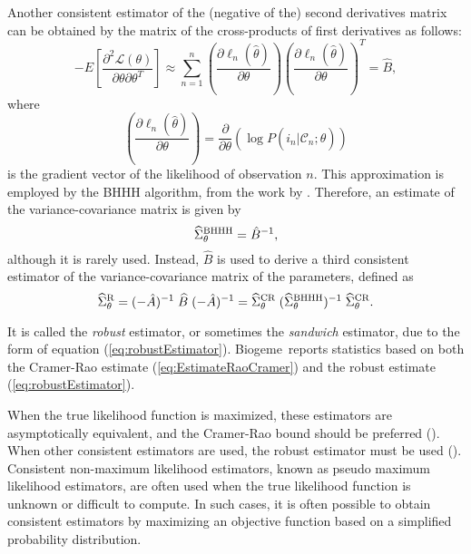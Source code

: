 \documentclass[12pt,a4paper]{article}
\newcommand{\req}[1]{(\ref{#1})}
\newcommand{\C}{\mathcal{C}}
\renewcommand{\L}{\mathcal{L}}
\newcommand{\BIOGEME}{Biogeme}
\begin{document}
Another consistent estimator of the (negative of the) second
derivatives matrix can be obtained by the matrix of the cross-products of first derivatives as follows:
\begin{equation}
\label{eq:binaryBHHH}
-E\left[ \frac{\partial^2 \L(\theta)}{\partial \theta \partial \theta^T}\right] \approx  \sum_{n=1}^n \left(\frac{\partial \ell_n(\hat{\theta})}{\partial \theta} \right)\left(\frac{\partial \ell_n(\hat{\theta})}{\partial \theta} \right)^T = \hat{B},
\end{equation}
 where
\begin{equation}
\left(\frac{\partial \ell_n(\hat{\theta})}{\partial \theta} \right) = \frac{\partial}{\partial \theta} (\log P(i_n|\C_n;\widehat{\theta}))
\end{equation}
is the gradient vector of the likelihood of observation $n$.
This approximation is employed by the BHHH algorithm, from the work by . Therefore, an estimate of the variance-covariance matrix 
is given by 
\begin{equation}
\widehat{\Sigma}^{\protect\text{BHHH}}_{\theta} =\hat{B}^{-1},
\end{equation}
 although it is rarely used. 
Instead, $\hat{B}$ is
used to derive  a third consistent estimator of the variance-covariance matrix of
the parameters, defined as
\begin{equation}
\label{eq:robustEstimator}
\widehat{\Sigma}^{\protect\text{R}}_{\theta} = (-\hat{A})^{-1} \; \widehat{B}\; (-\hat{A})^{-1} = \widehat{\Sigma}^{\protect\text{CR}}_{\theta} \; (\widehat{\Sigma}^{\protect\text{BHHH}}_{\theta})^{-1} \; \widehat{\Sigma}^{\protect\text{CR}}_{\theta}.
\end{equation}

It is
called the \emph{robust} estimator, or sometimes the \emph{sandwich}
estimator, due to the form of equation
\req{eq:robustEstimator}. \BIOGEME\ reports statistics based on  both the Cramer-Rao estimate
\req{eq:EstimateRaoCramer} and the robust estimate \req{eq:robustEstimator}.


 When the true likelihood function is maximized,  these estimators are
 asymptotically equivalent, and the Cramer-Rao bound should be
preferred (\cite{KaueCarr2001}).  When other consistent estimators are
used, the robust estimator must be used
(\cite{Whit82}). Consistent non-maximum likelihood estimators, known
as pseudo maximum likelihood estimators, are often used when the true
likelihood function is unknown or difficult to compute. In such cases,
it is often possible to obtain consistent estimators by maximizing an
objective function based on a simplified probability distribution. 



\end{document}
